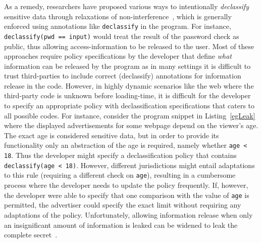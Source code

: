 As a remedy, researchers have proposed various ways to intentionally
\emph{declassify} sensitive data through relaxations of
non-interference~\cite{dimDecl}, which is generally enforced using
annotations like \texttt{declassify} in the program. For instance,
\lstinline{declassify(pwd == input)} would treat the result of the
password check as public, thus allowing access-information to be
released to the user.
Most of these approaches require policy specifications by the
developer that define \emph{what} information can be released by the
program 
  as in many settings it is difficult to trust
  third-parties to include correct (declassify) annotations for
  information release in the code. However, in highly dynamic
scenarios like the web where the third-party code is unknown before
loading-time, it is difficult for the developer to specify an
appropriate  policy with declassification specifications that caters
to all possible codes. For instance, consider the program snippet in
Listing~\ref{egLeak} where the displayed advertisements for some
webpage depend on the viewer's age. The exact age is
considered sensitive data, but in order to provide its functionality only 
an abstraction of the age is required, namely whether \lstinline{age < 18}.
Thus the developer might specify a declassification policy that contains
\lstinline{declassify(age < 18)}. However, different jurisdictions might
entail adaptations to this rule %
(requiring a different check on \lstinline{age}), %
resulting in a cumbersome process where the developer needs to update
the policy frequently. If, however, the developer were able to specify
that one comparison with the value of \lstinline{age} is permitted, the advertiser
could specify the exact limit without requiring any adaptations of
the policy.
%
Unfortunately, allowing information release
when only an insignificant amount of information is leaked %
can be widened to leak the complete
secret~\cite{relSec,delRelease}. 


